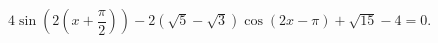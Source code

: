 \begin{ex}[type=equation]
	\begin{condition}
		$\ 4\sin{\left(2\left(x + \dfrac{\pi}{2}\right)\right)} -2\left(\sqrt{5}-\sqrt{3}\right) \cos{\left(2x -\pi\right)} + \sqrt{15} - 4 = 0. $
	\end{condition}
\end{ex}